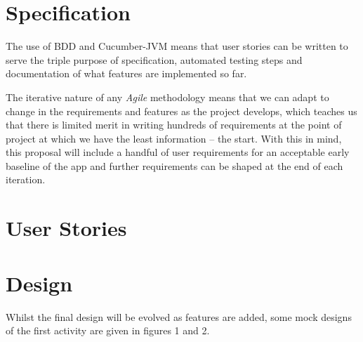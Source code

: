 \documentclass{article}
\begin{document}
\section{Specification}

The use of BDD and Cucumber-JVM means that user stories can be written to
serve the triple purpose of specification, automated testing steps and
documentation of what features are implemented so far.

The iterative
nature of any \emph{Agile} methodology means that we can adapt to change
in the requirements and features as the project develops, which teaches
us that there is limited merit in writing hundreds of requirements at the
point of project at which we have the least information -- the start. With
this in mind, this proposal will include a handful of user requirements for
an acceptable early baseline of the app and further requirements can be
shaped at the end of each iteration.

\section{User Stories}
\vspace*{\fill}

\vspace*{\fill}

\vspace*{\fill}

\vspace*{\fill}

\vspace*{\fill}
\pagebreak
\vspace*{\fill}

\vspace*{\fill}

\vspace*{\fill}

\section{Design}

Whilst the final design will be evolved as features are added, some mock
designs of the first activity are given in figures 1 and 2.

\vspace*{\fill}
\end{document}
